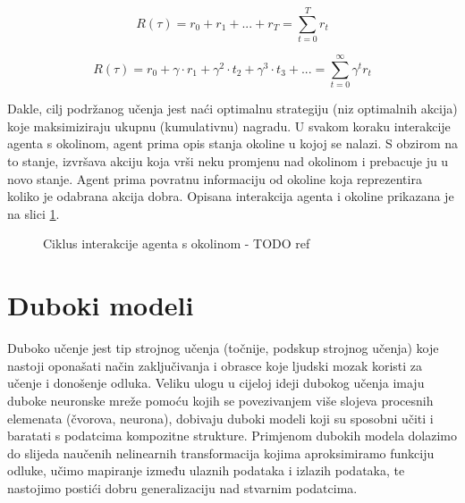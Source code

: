 \begin{equation}
    \label{md:undiscounted-return}
    R(\tau) = r_0 + r_1 + ... + r_T = \sum_{t=0}^{T}r_t
\end{equation}

\begin{equation}
    \label{md:discounted-return}
    R(\tau) = r_0 + \gamma \cdot r_1 + \gamma^2 \cdot t_2 + \gamma^3 \cdot t_3 + ... = \sum_{t=0}^{\infty}\gamma^t r_t
\end{equation}


Dakle, cilj podržanog učenja jest naći optimalnu strategiju (niz optimalnih akcija) koje maksimiziraju ukupnu (kumulativnu) nagradu. U svakom koraku interakcije agenta s okolinom, agent prima opis stanja okoline u kojoj se nalazi. S obzirom na to stanje, izvršava akciju koja vrši neku promjenu nad okolinom i prebacuje ju u novo stanje. Agent prima povratnu informaciju od okoline koja reprezentira koliko je odabrana akcija dobra. Opisana interakcija agenta i okoline prikazana je na slici \ref{fig:rl}.

\begin{figure}[H]
    \centering
    \caption{Ciklus interakcije agenta s okolinom - TODO ref}
    \label{fig:rl}
\end{figure}

\section{Duboki modeli}

Duboko učenje  jest tip strojnog učenja (točnije, podskup strojnog učenja) koje nastoji oponašati način zaključivanja i obrasce koje ljudski mozak koristi za učenje i donošenje odluka. Veliku ulogu u cijeloj ideji dubokog učenja imaju duboke neuronske mreže  pomoću kojih se povezivanjem više slojeva procesnih elemenata (čvorova, neurona), dobivaju duboki modeli koji su sposobni učiti i baratati s podatcima kompozitne strukture. Primjenom dubokih modela dolazimo do slijeda naučenih nelinearnih transformacija kojima aproksimiramo funkciju odluke, učimo mapiranje između ulaznih podataka i izlazih podataka, te nastojimo postići dobru generalizaciju nad stvarnim podatcima. 

